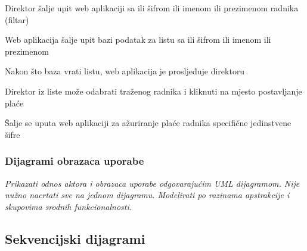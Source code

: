 \begin{packed_item}
\begin{packed_item}
\begin{packed_enum}
						\item Direktor šalje upit web aplikaciji sa ili šifrom ili imenom ili prezimenom radnika (filtar)
						\item Web aplikacija šalje upit bazi podatak za listu sa ili šifrom ili imenom ili prezimenom 
						\item Nakon što baza vrati listu, web aplikacija je prosljeđuje direktoru
						\item Direktor iz liste može odabrati traženog radnika i kliknuti na mjesto postavljanje plaće
						\item Šalje se uputa web aplikaciji za ažuriranje plaće radnika specifične jedinstvene šifre
						
					\end{packed_enum}
					
				\end{packed_item}
				
					
				\end{packed_item}

				\pagebreak
				\subsubsection{Dijagrami obrazaca uporabe}
					
					\textit{Prikazati odnos aktora i obrazaca uporabe odgovarajućim UML dijagramom. Nije nužno nacrtati sve na jednom dijagramu. Modelirati po razinama apstrakcije i skupovima srodnih funkcionalnosti.}
				\eject		
				
			\subsection{Sekvencijski dijagrami}
				
